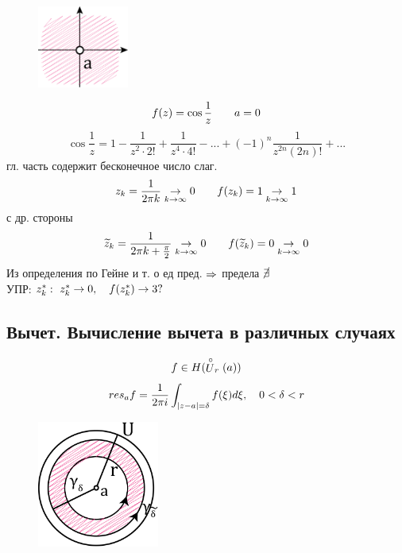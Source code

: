 \documentclass[main]{subfiles}
\begin{document}
    \begin{Example}[3 сущ. ос-ть]\
        \begin{figure}[H]
            \includegraphics[width=3cm]{pics/13_2}
            \centering
        \end{figure}
        \[f(z) = \cos \frac{1}{z} \qquad a = 0\]
        \[\cos \frac{1}{z} = 1 - \frac{1}{z^2 \cdot 2!} + \frac{1}{z^4 \cdot 4!} - ... +
        (-1)^n \frac{1}{z^{2n}(2n)! } + ...\]
        гл. часть содержит бесконечное число слаг.\\
        \[z_k = \frac{1}{2\pi k} \underset{k \to \infty}{\to } 0 \qquad f(z_k) = 1 \underset{k \to \infty}{\to } 1\]
        с др. стороны
        \[\widetilde{z}_k = \frac{1}{2\pi k + \frac{\pi}{2}} \underset{k \to \infty}{\to } 0\qquad
        f(\widetilde{z}_k) = 0 \underset{k \to \infty}{\to } 0\]
        Из определения по Гейне и т. о ед пред. $\Rightarrow $ предела $\cancel{\exists }$\\
        УПР: $z^*_k : \ z_k^* \to  0, \quad f(z_k^*) \to 3?$
    \end{Example}

    \newpage
    \subsection{Вычет. Вычисление вычета в различных случаях}

    \begin{Definition}
        \[f \in H(\stackrel{\circ}{U}_r(a))\]
        \[res_a f = \frac{1}{2\pi i}\int_{\left|z - a\right| = \delta} f(\xi)d\xi , \quad 0 < \delta < r \]
        \begin{figure}[H]
            \includegraphics[width=4cm]{pics/13_3}
            \centering
        \end{figure}
    \end{Definition}
\end{document}
